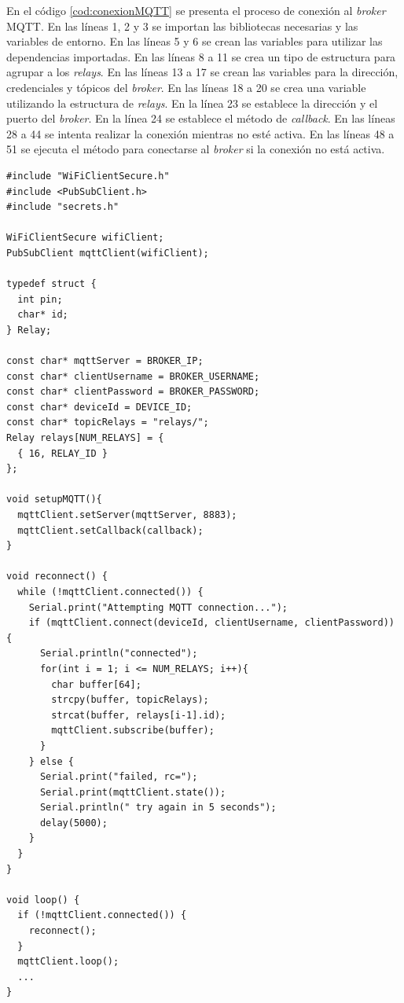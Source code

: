 En el código \ref{cod:conexionMQTT} se presenta el proceso de conexión al \emph{broker} MQTT. En las líneas 1, 2 y 3 se importan las bibliotecas necesarias y las variables de entorno.  En las  líneas 5 y 6 se crean las variables para utilizar las dependencias importadas. En las líneas 8 a 11 se crea un tipo de estructura para agrupar a los \textit{relays}. En las líneas 13 a 17 se crean las variables para la dirección, credenciales y tópicos del \emph{broker}. En las líneas 18 a 20 se crea una variable utilizando la estructura de \textit{relays}. En la línea 23 se establece la dirección y el puerto del \emph{broker}. En la línea 24 se establece el método de \emph{callback}. En las líneas 28 a 44 se intenta realizar la conexión mientras no esté activa. En las líneas 48 a 51 se ejecuta el método para conectarse al \emph{broker} si la conexión no está activa.

\newpage
\begin{lstlisting}[label=cod:conexionMQTT,caption=Conexión al \emph{broker} MQTT]
#include "WiFiClientSecure.h"
#include <PubSubClient.h>
#include "secrets.h"

WiFiClientSecure wifiClient;
PubSubClient mqttClient(wifiClient);

typedef struct {
  int pin;
  char* id;
} Relay;

const char* mqttServer = BROKER_IP;
const char* clientUsername = BROKER_USERNAME;
const char* clientPassword = BROKER_PASSWORD;
const char* deviceId = DEVICE_ID;
const char* topicRelays = "relays/";
Relay relays[NUM_RELAYS] = {
  { 16, RELAY_ID }
};

void setupMQTT(){
  mqttClient.setServer(mqttServer, 8883);
  mqttClient.setCallback(callback);
}

void reconnect() {
  while (!mqttClient.connected()) {
    Serial.print("Attempting MQTT connection...");
    if (mqttClient.connect(deviceId, clientUsername, clientPassword)) {
      Serial.println("connected");
      for(int i = 1; i <= NUM_RELAYS; i++){
        char buffer[64];
        strcpy(buffer, topicRelays);
        strcat(buffer, relays[i-1].id);
        mqttClient.subscribe(buffer);
      }
    } else {
      Serial.print("failed, rc=");
      Serial.print(mqttClient.state());
      Serial.println(" try again in 5 seconds");
      delay(5000);
    }
  }
}

void loop() {
  if (!mqttClient.connected()) {
    reconnect();
  }
  mqttClient.loop();
  ...
}
\end{lstlisting}